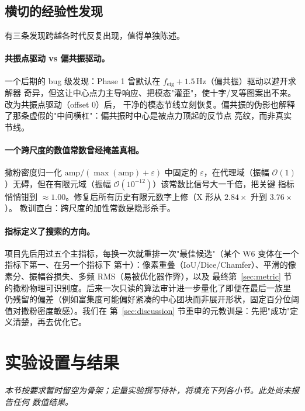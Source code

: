 \documentclass[11pt,a4paper]{article}
\begin{document}
\subsection{横切的经验性发现}\label{sec:crosscut}
有三条发现跨越各时代反复出现，值得单独陈述。

\paragraph{共振点驱动 vs 偏共振驱动。}
一个后期的 bug 级发现：Phase 1 曾默认在 $f_{\text{eig}}+1.5\,\text{Hz}$（偏共振）驱动以避开求解器
奇异，但这让中心点力主导响应、把模态"灌歪"，使十字/叉等图案出不来。改为共振点驱动（offset 0）后，
干净的模态节线立刻恢复。偏共振的伪影也解释了那条虚假的"中间横杠"：偏共振时中心是被点力顶起的反节点
亮纹，而非真实节线。

\paragraph{一个跨尺度的数值常数曾经掩盖真相。}
撒粉密度归一化 $\text{amp}/(\max(\text{amp})+\varepsilon)$ 中固定的 $\varepsilon$，在代理域（振幅
$\mathcal{O}(1)$）无碍，但在有限元域（振幅 $\mathcal{O}(10^{-12})$）该常数比信号大一千倍，把关键
指标悄悄钳到 $\approx1.00$。修复后所有历史有限元数字上修（X 形从 $2.84\times$ 升到 $3.76\times$）。
教训直白：跨尺度的加性常数是隐形杀手。

\paragraph{指标定义了搜索的方向。}
项目先后用过五个主指标，每换一次就重排一次"最佳候选"（某个 W6 变体在一个指标下第一、在另一个指标下
第十）：像素重叠（IoU/Dice/Chamfer）、平滑的像素分、振幅谷损失、多频 RMS（易被优化器作弊），以及
最终第~\ref{sec:metric} 节的撒粉物理可识别度。后来一次只读的算法审计进一步量化了即便在最后一族里
仍残留的偏差（例如富集度可能偏好紧凑的中心团块而非展开形状，固定百分位阈值对撒粉密度敏感）。我们在
第~\ref{sec:discussion} 节重申的元教训是：先把"成功"定义清楚，再去优化它。

\section{实验设置与结果}\label{sec:experiments}

\noindent\emph{本节按要求暂时留空为骨架；定量实验撰写待补，将填充下列各小节。此处尚未报告任何
数值结果。}
\end{document}
